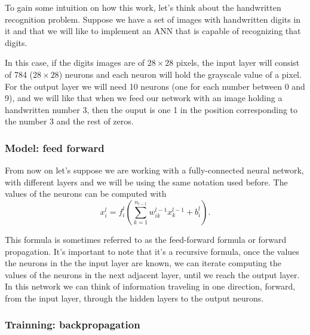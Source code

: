 \begin{exampleBox}
  To gain some intuition on how this work, let's think about the handwritten
  recognition problem. Suppose we have a set of images with handwritten digits
  in it and that we will like to implement an ANN that is capable of
  recognizing that digits.

  In this case, if the digits images are of \(28 \times 28\) pixels, the input
  layer will consist of 784 (\(28 \times 28\)) neurons and each neuron will
  hold the grayscale value of a pixel. For the output layer we will need 10
  neurons (one for each number between 0 and 9), and we will like that when we
  feed our network with an image holding a handwritten number 3, then the ouput
  is one 1 in the position corresponding to the number 3 and the rest of zeros.
\end{exampleBox}

\subsubsection{Model: feed forward}\label{subsec:forward}

From now on let's suppose we are working with a fully-connected neural network,
with different layers and we will be using the same notation used before. The
values of the neurons can be computed with
\begin{equation}
  x_i^l = f_i^l \left(
    \sum_{k=1}^{n_{l-1}} w_{ik}^{l-1} x_{k}^{l-1} + b_i^l
  \right).
\end{equation}

This formula is sometimes referred to as the feed-forward formula or forward
propagation. It's important to note that it's a recursive formula, once the
values the neurons in the the input layer are known, we can iterate computing
the values of the neurons in the next adjacent layer, until we reach the output
layer. In this network we can think of information traveling in one direction,
forward, from the input layer, through the hidden layers to the output neurons.

\subsubsection{Trainning: backpropagation}%
\label{sec:backward}

